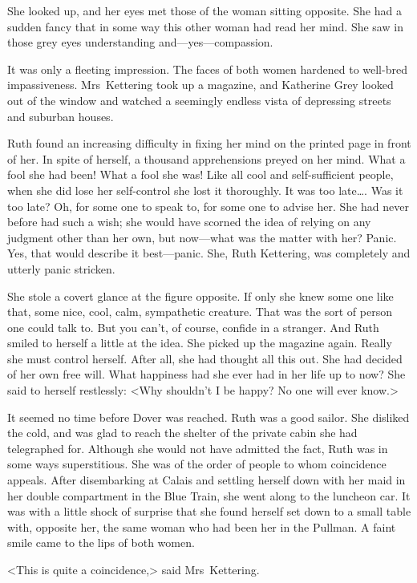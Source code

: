She looked up, and her eyes met those of the woman sitting opposite. She had a sudden fancy that in some way this other woman had read her mind. She saw in those grey eyes understanding and—yes—compassion.

It was only a fleeting impression. The faces of both women hardened to well-bred impassiveness. Mrs~Kettering took up a magazine, and Katherine Grey looked out of the window and watched a seemingly endless vista of depressing streets and suburban houses.

Ruth found an increasing difficulty in fixing her mind on the printed page in front of her. In spite of herself, a thousand apprehensions preyed on her mind. What a fool she had been! What a fool she was! Like all cool and self-sufficient people, when she did lose her self-control she lost it thoroughly. It was too late\dots. Was it too late? Oh, for some one to speak to, for some one to advise her. She had never before had such a wish; she would have scorned the idea of relying on any judgment other than her own, but now—what was the matter with her? Panic. Yes, that would describe it best—panic. She, Ruth Kettering, was completely and utterly panic stricken.

She stole a covert glance at the figure opposite. If only she knew some one like that, some nice, cool, calm, sympathetic creature. That was the sort of person one could talk to. But you can't, of course, confide in a stranger. And Ruth smiled to herself a little at the idea. She picked up the magazine again. Really she must control herself. After all, she had thought all this out. She had decided of her own free will. What happiness had she ever had in her life up to now? She said to herself restlessly: <Why shouldn't I be happy? No one will ever know.>

It seemed no time before Dover was reached. Ruth was a good sailor. She disliked the cold, and was glad to reach the shelter of the private cabin she had telegraphed for. Although she would not have admitted the fact, Ruth was in some ways superstitious. She was of the order of people to whom coincidence appeals. After disembarking at Calais and settling herself down with her maid in her double compartment in the Blue Train, she went along to the luncheon car. It was with a little shock of surprise that she found herself set down to a small table with, opposite her, the same woman who had been her  in the Pullman. A faint smile came to the lips of both women.

<This is quite a coincidence,> said Mrs~Kettering.

